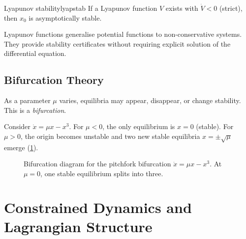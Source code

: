 \documentclass[12pt,openany]{book}
\begin{document}
\begin{theorem}{Lyapunov stability}{lyapstab}
  If a Lyapunov function $V$ exists with $\dot V<0$ (strict), then $x_0$ is
  asymptotically stable.
\end{theorem}

Lyapunov functions generalise potential functions to non-conservative systems.
They provide stability certificates without requiring explicit solution of the
differential equation.

\section{Bifurcation Theory}

As a parameter $\mu$ varies, equilibria may appear, disappear, or change
stability. This is a \emph{bifurcation}.

\begin{example}
  Consider $\dot x = \mu x - x^3$. For $\mu<0$, the only equilibrium is $x=0$
  (stable). For $\mu>0$, the origin becomes unstable and two new stable
  equilibria $x=\pm\sqrt{\mu}$ emerge (\cref{fig:pitchfork}).
\end{example}

\begin{figure}[H]
\centering
{}
\caption{Bifurcation diagram for the pitchfork bifurcation $\dot x=\mu x-x^3$.
At $\mu=0$, one stable equilibrium splits into three.}
\label{fig:pitchfork}
\end{figure}

\chapter{Constrained Dynamics and Lagrangian Structure}
\label{ch:lagrange}
\end{document}
